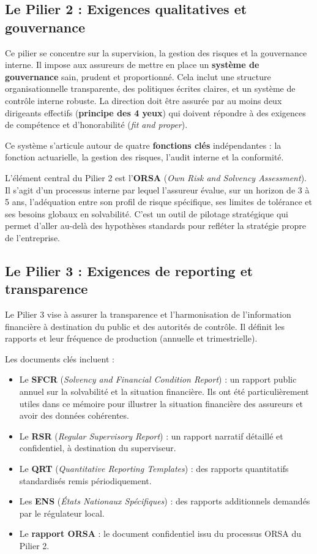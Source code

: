 \subsection{Le Pilier 2 : Exigences qualitatives et gouvernance}

Ce pilier se concentre sur la supervision, la gestion des risques et la gouvernance interne. Il impose aux assureurs de mettre en place un \textbf{système de gouvernance} sain, prudent et proportionné. Cela inclut une structure organisationnelle transparente, des politiques écrites claires, et un système de contrôle interne robuste. La direction doit être assurée par au moins deux dirigeants effectifs (\textbf{principe des 4 yeux}) qui doivent répondre à des exigences de compétence et d'honorabilité (\textit{fit and proper}).



Ce système s'articule autour de quatre \textbf{fonctions clés} indépendantes : la fonction actuarielle, la gestion des risques, l'audit interne et la conformité.



L'élément central du Pilier 2 est l'\textbf{ORSA} (\textit{Own Risk and Solvency Assessment}). Il s'agit d'un processus interne par lequel l'assureur évalue, sur un horizon de 3 à 5 ans, l'adéquation entre son profil de risque spécifique, ses limites de tolérance et ses besoins globaux en solvabilité. C'est un outil de pilotage stratégique qui permet d'aller au-delà des hypothèses standards pour refléter la stratégie propre de l'entreprise.
\subsection{Le Pilier 3 : Exigences de reporting et transparence}

Le Pilier 3 vise à assurer la transparence et l'harmonisation de l'information financière à destination du public et des autorités de contrôle. Il définit les rapports et leur fréquence de production (annuelle et trimestrielle).



Les documents clés incluent :
\begin{itemize}
    \item Le \textbf{SFCR} (\textit{Solvency and Financial Condition Report}) : un rapport public annuel sur la solvabilité et la situation financière. Ils ont été particulièrement utiles dans ce mémoire pour illustrer la situation financière des assureurs et avoir des données cohérentes.
        \item Le \textbf{RSR} (\textit{Regular Supervisory Report}) : un rapport narratif détaillé et confidentiel, à destination du superviseur.
        \item Le \textbf{QRT} (\textit{Quantitative Reporting Templates}) : des rapports quantitatifs standardisés remis périodiquement.
        \item Les \textbf{ENS} (\textit{États Nationaux Spécifiques}) : des rapports additionnels demandés par le régulateur local.
        \item Le \textbf{rapport ORSA} : le document confidentiel issu du processus ORSA du Pilier 2.
\end{itemize}

